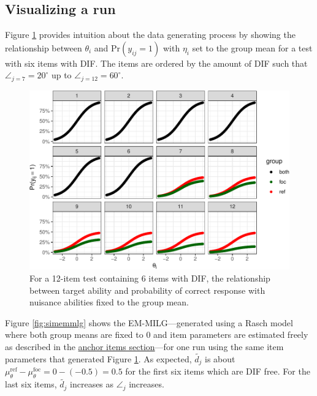 \documentclass[
  11pt,
]{article}
\begin{document}
\hypertarget{visualizing-a-run}{%
\subsection{Visualizing a run}\label{visualizing-a-run}}

Figure \ref{fig:difmap} provides intuition about the data generating process by showing the relationship between \(\theta_i\) and \(\text{Pr}(y_{ij} = 1)\) with \(\eta_i\) set to the group mean for a test with six items with DIF. The items are ordered by the amount of DIF such that \(\angle_{j = 7} = 20^\circ\) up to \(\angle_{j = 12} = 60^\circ\).

\begin{figure}[H]

{\centering \includegraphics[width=0.7\linewidth]{paper_files/figure-latex/difmap-1} 

}

\caption{For a 12-item test containing 6 items with DIF, the relationship between target ability and probability of correct response with nuisance abilities fixed to the group mean.}\label{fig:difmap}
\end{figure}

Figure \ref{fig:simemmlg} shows the EM-MILG---generated using a Rasch model where both group means are fixed to 0 and item parameters are estimated freely as described in the \protect\hyperlink{anchoritems}{anchor items section}---for one run using the same item parameters that generated Figure \ref{fig:difmap}. As expected, \(\tilde{d_j}\) is about \(\mu_\theta^\text{ref} - \mu_\theta^\text{foc}= 0 - (-0.5) = 0.5\) for the first six items which are DIF free. For the last six items, \(\tilde{d_j}\) increases as \(\angle_j\) increases.
\end{document}
